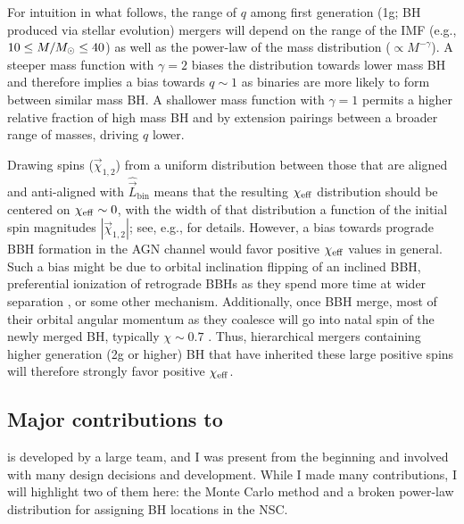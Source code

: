 For intuition in what follows, the range of $q$ among first generation (1g; BH produced via stellar evolution) mergers will depend on the range of the IMF (e.g., $10\leq M/M_{\odot} \leq 40$) as well as the power-law of the mass distribution ($\propto M^{-\gamma}$).
A steeper mass function with $\gamma = 2$ biases the distribution towards lower mass BH and therefore implies a bias towards $q \sim 1$ as binaries are more likely to form between similar mass BH.
A shallower mass function with $\gamma = 1$ permits a higher relative fraction of high mass BH and by extension pairings between a broader range of masses, driving $q$ lower.

Drawing spins ($\vec{\chi}_{1,2}$) from a uniform distribution between those that are aligned and anti-aligned with $\hat{\vec{L}}_\text{bin}$ means that the resulting $\chi_{\rm eff}$ distribution should be centered on $\chi_{\rm eff} \sim 0$, with the width of that distribution a function of the initial spin magnitudes $|\vec{\chi}_{1,2}|$; see, e.g., \cite{Callister21} for details.
However, a bias towards prograde BBH formation in the AGN channel would favor positive $\chi_{\rm eff}$ values in general.
Such a bias might be due to orbital inclination flipping \citep{DittmannDempseyLi24} of an inclined BBH, preferential ionization of retrograde BBHs as they spend more time at wider separation \citep[on average,][]{Wang+21,Calcino+23}, or some other mechanism.
Additionally, once BBH merge, most of their orbital angular momentum as they coalesce will go into natal spin of the newly merged BH, typically $\chi \sim 0.7$ \citep{TichyMarronetti08}.
Thus, hierarchical mergers containing higher generation (2g or higher) BH that have inherited these large positive spins will therefore strongly favor positive $\chi_{\rm eff}$.

\subsection{Major contributions to \mcfacts}

\mcfacts is developed by a large team, and I was present from the beginning and involved with many design decisions and development.
While I made many contributions, I will highlight two of them here: the Monte Carlo method and a broken power-law distribution for assigning BH locations in the NSC.

